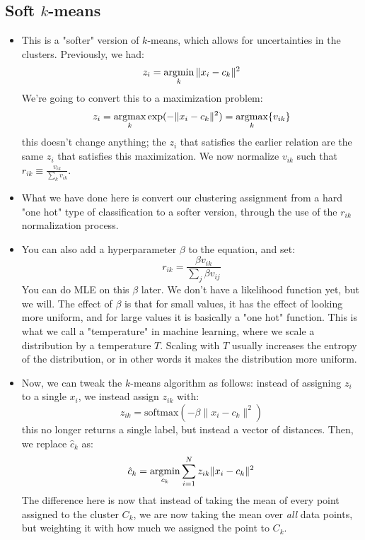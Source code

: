 \subsection{Soft \( k \)-means}
\begin{itemize}
	\item This is a "softer" version of \( k \)-means, which allows for uncertainties in the clusters.
		Previously, we had:
		\[
			z_i = \operatorname*{argmin}_k \|x_i - c_k\|^2
		\]
		We're going to convert this to a maximization problem:
		\[
			z_i = \operatorname*{argmax}_k \operatorname*{exp}(- \|x_i - c_k\|^2) = \operatorname*{argmax}_k \{v_{ik}\}
		\]
		this doesn't change anything; the \( z_i \) that satisfies the earlier relation are the same \( z_i
		\) that satisfies this maximization. We now normalize \( v_{ik} \) such that \( r_{ik} \equiv
		\frac{v_{ik}}{\sum_k v_{ik}} \).    
	\item What we have done here is convert our clustering assignment from a hard "one hot" type of
		classification to a softer version, through the use of the \( r_{ik} \) normalization process.



	\item You can also add a hyperparameter \( \beta \) to the equation, and set:
		\[
			r_{ik} = \frac{\beta v_{ik}}{\sum_j \beta v_{ij}}
		\]
		You can do MLE on this \( \beta \) later. We don't have a likelihood function yet, but we will. The
		effect of \( \beta \) is that for small values, it has the effect of looking more uniform, and for
		large values it is basically a "one hot" function.
		This is what we call a "temperature" in machine learning, where we scale a distribution by a
		temperature \( T \). Scaling with \( T \) usually increases the entropy of the distribution, or in
		other words it makes the distribution more uniform.   
	\item Now, we can tweak the \( k \)-means algorithm as follows: instead of assigning \( z_i \) to a
		single \( x_i \), we instead assign \( z_{ik} \) with:
		\[
			z_{ik} = \text{softmax}(-\beta \|x_i - c_k\|^2)
		\]
		this no longer returns a single label, but instead a vector of distances. Then, we replace \(
		\hat{c}_k \) as:
		\[
			\hat{c}_k = \operatorname*{argmin}_{c_k} \sum_{i = 1}^{N} z_{ik} \|x_i - c_k\|^2
		\]
		The difference here is now that instead of taking the mean of every point assigned to the cluster \(
		C_k\), we are now taking the mean over \textit{all} data points, but weighting it with how much we
		assigned the point to \( C_k \). 
\end{itemize}

